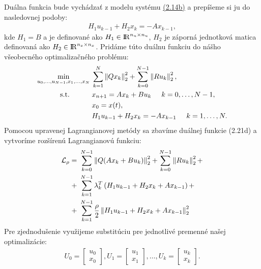 Duálna funkcia bude vychádzať z modelu systému \hyperref[math:2.14]{(2.14b)} a prepíšeme si ju do nasledovnej podoby:
\begin{align}
	H_{1}u_{k-1} + H_{2}x_{k} = -Ax_{k-1},
\end{align}
kde $H_{1} = B$ a je definované ako $H_{1} \in {\rm I\!R}^{n_{u}\times n_{u}}$, $H_{2}$ je záporná jednotková matica definovaná ako $H_{2} \in {\rm I\!R}^{n_{x}\times n_{x}}$. Pridáme túto duálnu funkciu do nášho všeobecného optimalizačného problému:
\begin{subequations}
	\begin{align}
		\displaystyle \min_{u_0,...,u_{N-1},x_1,...,x_N} \hspace{0.1cm} & 
		\sum_{k=1}^{N}
		\left\lVert Qx_k\right\rVert^{2}_{2}+\sum_{k=0}^{N-1}\left\lVert Ru_k\right\rVert^{2}_{2},\\
		\textrm{s.t.} \hspace{1.1cm} & x_{n+1} = Ax_{k}+Bu_{k} \hspace{0.5cm} k=0,\dots,N-1,\\
		& x_{0} = x(t),\\
		&H_{1}u_{k-1} + H_{2}x_{k} = -Ax_{k-1}\hspace{0.5cm} k=1,\dots,N.
	\end{align}
\end{subequations}
Pomocou upravenej Lagrangianovej metódy sa zbavíme duálnej funkcie (2.21d) a vytvoríme rozšírenú Lagrangianovú funkciu:
\label{math:RozsirenyLag}
\begin{equation}
\begin{split}
\mathcal{L}_{\rho} =&~ \sum_{k=0}^{N-1}\left\lVert Q(Ax_{k}+Bu_{k})\right\rVert^{2}_{2}+\sum_{k=0}^{N-1}\left\lVert Ru_k\right\rVert^{2}_{2} +\\+&~\sum_{k=1}^{N-1}\lambda_{k}^{T}\left(  H_{1}u_{k-1} + H_{2}x_{k} + Ax_{k-1}\right) +\\+&~\sum_{k=1}^{N-1}\frac{\rho}{2} \left\lVert H_{1}u_{k-1} + H_{2}x_{k} + Ax_{k-1}\right\rVert_{2}^{2}
\end{split}
\end{equation}
Pre zjednodušenie využijeme substitúciu pre jednotlivé premenné našej optimalizácie:
\begin{align}
	U_{0} =\begin{bmatrix}
	u_{0}\\
	x_{0}
	\end{bmatrix},
	U_{1} =\begin{bmatrix}
	u_{1}\\
	x_{1}
	\end{bmatrix}, \dots ,
	U_{k} =\begin{bmatrix}
	u_{k}\\
	x_{k}
	\end{bmatrix}.
\end{align}
